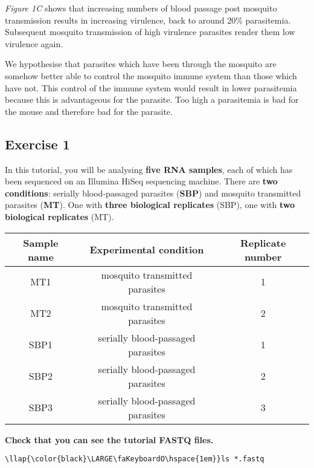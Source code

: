 \documentclass[11pt]{article}
\begin{document}
\textit{Figure 1C} shows that increasing numbers of blood passage post
mosquito transmission results in increasing virulence, back to around
20\% parasitemia. Subsequent mosquito transmission of high virulence
parasites render them low virulence again.

We hypothesise that parasites which have been through the mosquito are
somehow better able to control the mosquito immune system than those
which have not. This control of the immune system would result in lower
parasitemia because this is advantageous for the parasite. Too high a
parasitemia is bad for the mouse and therefore bad for the parasite.

    \hypertarget{exercise-1}{%
\subsection{Exercise 1}\label{exercise-1}}

    In this tutorial, you will be analysing \textbf{five RNA samples}, each
of which has been sequenced on an Illumina HiSeq sequencing machine.
There are \textbf{two conditions}: serially blood-passaged parasites
(\textbf{SBP}) and mosquito transmitted parasites (\textbf{MT}). One
with \textbf{three biological replicates} (SBP), one with \textbf{two
biological replicates} (MT).

    \begin{longtable}[]{@{}ccc@{}}
\hline
Sample name & Experimental condition & Replicate number\tabularnewline
\hline
\endhead
MT1 & mosquito transmitted parasites & 1\tabularnewline
MT2 & mosquito transmitted parasites & 2\tabularnewline
SBP1 & serially blood-passaged parasites & 1\tabularnewline
SBP2 & serially blood-passaged parasites & 2\tabularnewline
SBP3 & serially blood-passaged parasites & 3\tabularnewline
\hline
\end{longtable}

    \textbf{Check that you can see the tutorial FASTQ files.}





\begin{terminalinput}
\begin{Verbatim}[commandchars=\\\{\}]
\llap{\color{black}\LARGE\faKeyboardO\hspace{1em}}ls *.fastq
\end{Verbatim}
\end{terminalinput}
\end{document}
